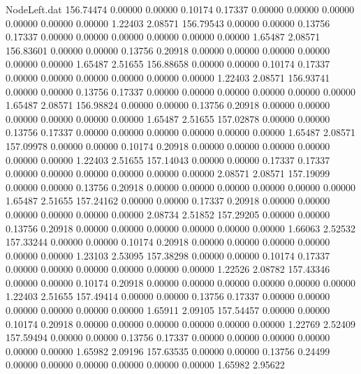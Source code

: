 \begin{filecontents}{NodeLeft.dat}
 156.74474    0.00000    0.00000     0.10174    0.17337    0.00000    0.00000    0.00000    0.00000    0.00000    0.00000    1.22403    2.08571
 156.79543    0.00000    0.00000     0.13756    0.17337    0.00000    0.00000    0.00000    0.00000    0.00000    0.00000    1.65487    2.08571
 156.83601    0.00000    0.00000     0.13756    0.20918    0.00000    0.00000    0.00000    0.00000    0.00000    0.00000    1.65487    2.51655
 156.88658    0.00000    0.00000     0.10174    0.17337    0.00000    0.00000    0.00000    0.00000    0.00000    0.00000    1.22403    2.08571
 156.93741    0.00000    0.00000     0.13756    0.17337    0.00000    0.00000    0.00000    0.00000    0.00000    0.00000    1.65487    2.08571
 156.98824    0.00000    0.00000     0.13756    0.20918    0.00000    0.00000    0.00000    0.00000    0.00000    0.00000    1.65487    2.51655
 157.02878    0.00000    0.00000     0.13756    0.17337    0.00000    0.00000    0.00000    0.00000    0.00000    0.00000    1.65487    2.08571
 157.09978    0.00000    0.00000     0.10174    0.20918    0.00000    0.00000    0.00000    0.00000    0.00000    0.00000    1.22403    2.51655
 157.14043    0.00000    0.00000     0.17337    0.17337    0.00000    0.00000    0.00000    0.00000    0.00000    0.00000    2.08571    2.08571
 157.19099    0.00000    0.00000     0.13756    0.20918    0.00000    0.00000    0.00000    0.00000    0.00000    0.00000    1.65487    2.51655
 157.24162    0.00000    0.00000     0.17337    0.20918    0.00000    0.00000    0.00000    0.00000    0.00000    0.00000    2.08734    2.51852
 157.29205    0.00000    0.00000     0.13756    0.20918    0.00000    0.00000    0.00000    0.00000    0.00000    0.00000    1.66063    2.52532
 157.33244    0.00000    0.00000     0.10174    0.20918    0.00000    0.00000    0.00000    0.00000    0.00000    0.00000    1.23103    2.53095
 157.38298    0.00000    0.00000     0.10174    0.17337    0.00000    0.00000    0.00000    0.00000    0.00000    0.00000    1.22526    2.08782
 157.43346    0.00000    0.00000     0.10174    0.20918    0.00000    0.00000    0.00000    0.00000    0.00000    0.00000    1.22403    2.51655
 157.49414    0.00000    0.00000     0.13756    0.17337    0.00000    0.00000    0.00000    0.00000    0.00000    0.00000    1.65911    2.09105
 157.54457    0.00000    0.00000     0.10174    0.20918    0.00000    0.00000    0.00000    0.00000    0.00000    0.00000    1.22769    2.52409
 157.59494    0.00000    0.00000     0.13756    0.17337    0.00000    0.00000    0.00000    0.00000    0.00000    0.00000    1.65982    2.09196
 157.63535    0.00000    0.00000     0.13756    0.24499    0.00000    0.00000    0.00000    0.00000    0.00000    0.00000    1.65982    2.95622

\end{filecontents}

